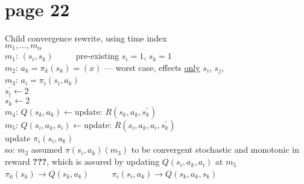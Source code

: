 \section*{page 22}

Child convergence rewrite, using time index\\

$m_1, \ldots, m_\alpha$\\

$m_1$: $(s_i,s_k)$ $\qquad$ pre-existing $s_i=1$, $s_k=1$\\

$m_2$: $a_k=\pi_k(s_k)=(x)$ --- worst case, effects \underline{only} $s_i$, $s_j$,\\

$m_3$: $a_i=\pi_i(s_i,a_k)$\\
$s^\prime_i\leftarrow 2$\\
$s^\prime_k\leftarrow 2$\\

$m_4$: $Q(s_k,a_k)\leftarrow \text{update}$: $R(s_k,a_k,s^\prime_k)$\\

$m_5$: $Q(s_i,a_k,s_i)\leftarrow \text{update}$: $R(s_i,a_k,a_i,s^\prime_k)$\\
update $\pi_i(s_i,a_k)$\\

so: $m_2$ assumed $\pi(s_i,a_k)(m_3)$ to be  convergent stochastic and monotonic in reward \textbf{???}, which is assured by updating $Q(s_i,a_k,a_i)$ at $m_5$\\

$\pi_k(s_k)\rightarrow Q(s_k,a_k)$ $\qquad$ $\pi_i(s_i,a_k)\rightarrow Q(s_k,a_k,s_k)$







